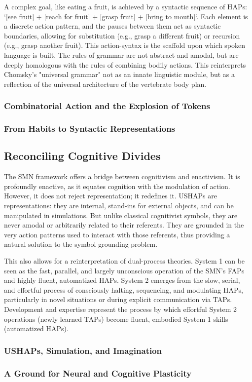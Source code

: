 A complex goal, like eating a fruit, is achieved by a syntactic sequence of HAPs: `[see fruit] + [reach for fruit] + [grasp fruit] + [bring to mouth]`. Each element is a discrete action pattern, and the pauses between them act as syntactic boundaries, allowing for substitution (e.g., grasp a different fruit) or recursion (e.g., grasp another fruit). This action-syntax is the scaffold upon which spoken language is built. The rules of grammar are not abstract and amodal, but are deeply homologous with the rules of combining bodily actions. This reinterprets Chomsky's "universal grammar" not as an innate linguistic module, but as a reflection of the universal architecture of the vertebrate body plan.

\subsubsection*{Combinatorial Action and the Explosion of Tokens}

\subsubsection*{From Habits to Syntactic Representations}

\subsection*{Reconciling Cognitive Divides}
The SMN framework offers a bridge between cognitivism and enactivism. It is profoundly enactive, as it equates cognition with the modulation of action. However, it does not reject representation; it redefines it. USHAPs are representations: they are internal, stand-ins for external objects, and can be manipulated in simulations. But unlike classical cognitivist symbols, they are never amodal or arbitrarily related to their referents. They are grounded in the very action patterns used to interact with those referents, thus providing a natural solution to the symbol grounding problem.

This also allows for a reinterpretation of dual-process theories. System 1 can be seen as the fast, parallel, and largely unconscious operation of the SMN's FAPs and highly fluent, automatized HAPs. System 2 emerges from the slow, serial, and effortful process of consciously halting, sequencing, and modulating HAPs, particularly in novel situations or during explicit communication via TAPs. Development and expertise represent the process by which effortful System 2 operations (newly learned TAPs) become fluent, embodied System 1 skills (automatized HAPs).

\subsubsection*{USHAPs, Simulation, and Imagination}

\subsubsection*{A Ground for Neural and Cognitive Plasticity}
